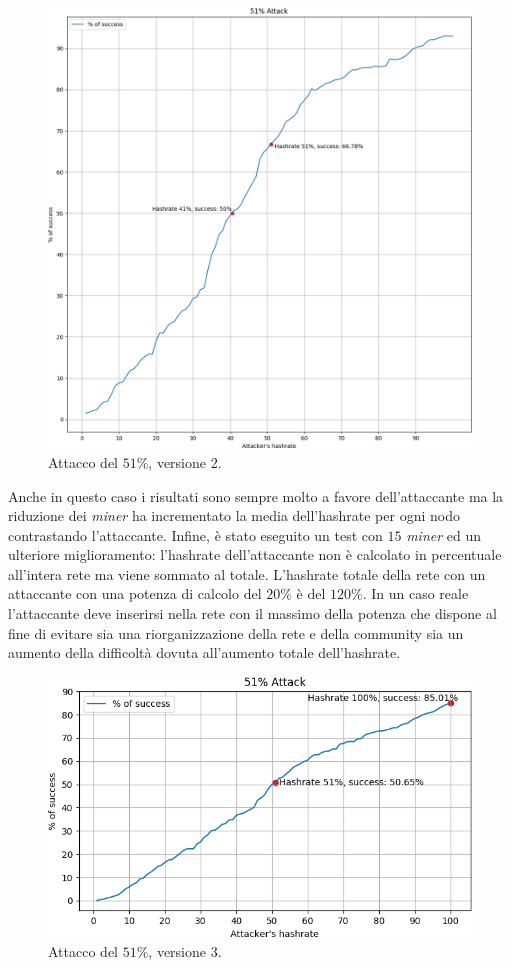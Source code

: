 \begin{figure}[H]
    \centering
    \includegraphics[width=\textwidth]{./images/51-v2.png}
    \caption{Attacco del $51\%$, versione 2.}
    \label{fig:51v2}
\end{figure}
Anche in questo caso i risultati sono sempre molto a favore dell'attaccante ma la riduzione dei \textit{miner} ha incrementato la media dell'hashrate per ogni nodo contrastando l'attaccante.\newline
Infine, è stato eseguito un test con $15$ \textit{miner} ed un ulteriore miglioramento: l'hashrate dell'attaccante non è calcolato in percentuale all'intera rete ma viene sommato al totale. L'hashrate totale della rete con un attaccante con una potenza di calcolo del $20\%$ è del $120\%$. In un caso reale l'attaccante deve inserirsi nella rete con il massimo della potenza che dispone al fine di evitare sia una riorganizzazione della rete e della community sia un aumento della difficoltà dovuta all'aumento totale dell'hashrate.
\begin{figure}[H]
    \centering
    \includegraphics[width=\textwidth]{./images/51-v3.png}
    \caption{Attacco del $51\%$, versione 3.}
    \label{fig:51v3}
\end{figure}
